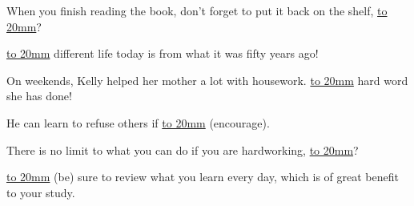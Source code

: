 \item {
    When you finish reading the book, don't forget to put it back on the shelf, \underline{\hbox to 20mm{}}?
} 
\item {
    \underline{\hbox to 20mm{}} different life today is from what it was fifty years ago!
} 
\item {
    On weekends, Kelly helped her mother a lot with housework. \underline{\hbox to 20mm{}} hard word she has done!
} 
\item {
    He can learn to refuse others if \underline{\hbox to 20mm{}} (encourage).
} 
\item {
    There is no limit to what you can do if you are hardworking,  \underline{\hbox to 20mm{}}?
} 
\item {
    \underline{\hbox to 20mm{}} (be) sure to review what you learn every day, which is of great benefit to your study.
} 